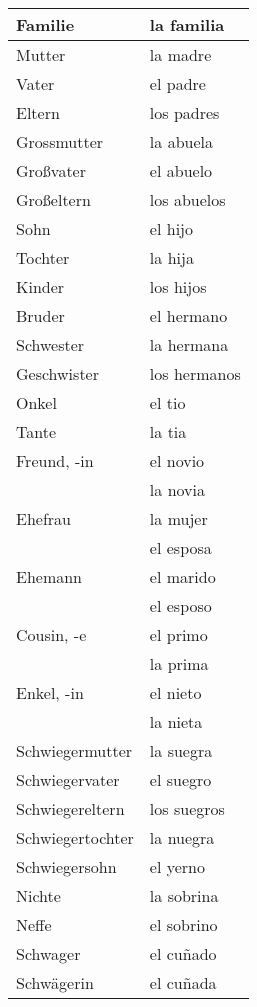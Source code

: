 \documentclass{spanish_summary}
\begin{document}
\begin{longtable}{p{} | p{}} 
\textbf{Familie}     & \textbf{la familia}                                       \\ \hline
\hline
\endhead %
Mutter &  la madre \\
Vater & el padre \\
Eltern & los padres \\
Gro{ss}mutter & la abuela \\
Großvater & el abuelo \\
Großeltern & los abuelos \\
Sohn & el hijo \\
Tochter & la hija \\
Kinder & los hijos \\
Bruder & el hermano \\
Schwester & la hermana \\
Geschwister & los hermanos \\
Onkel & el tio \\
Tante & la tia \\
Freund, -in & el novio \\
            & la novia \\
Ehefrau & la mujer \\
        & el esposa \\
Ehemann & el marido \\
        & el esposo \\
Cousin, -e & el primo \\
           & la prima \\
Enkel, -in & el nieto \\
           & la nieta \\
Schwiegermutter & la suegra \\
Schwiegervater & el suegro \\
Schwiegereltern & los suegros \\
Schwiegertochter & la nuegra \\
Schwiegersohn & el yerno \\
Nichte & la sobrina \\
Neffe & el sobrino \\
Schwager & el cu\~{n}ado\\
Schwägerin & el cu\~{n}ada

\end{longtable}
\end{document}
